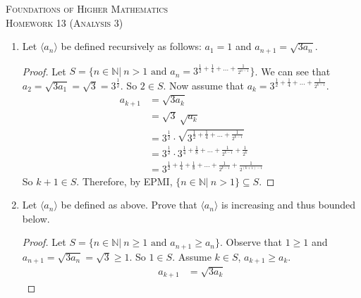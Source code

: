 \documentclass{article}
\theoremstyle{problem}
\theoremstyle{plain}
\theoremstyle{remark}
\begin{document}
\begin{center}
  \textsc{\Large Foundations of Higher Mathematics}\\[.3cm]
  \textsc{\Large Homework 13 (Analysis 3)}
\end{center}

\begin{enumerate}
\item Let $\langle a_n \rangle$ be defined recursively as follows: $a_1 = 1$ and $a_{n+1} = \sqrt{3a_n}$. 
\begin{proof}
  Let $S = \{n \in \mathbb N|\ n > 1 \text{ and } a_n = 3^{\frac{1}{2} + \frac{1}{4} + \ldots + \frac{1}{2^{n-1}}}\}$. We can see that $a_2 = \sqrt{3a_1} = \sqrt{3} = 3^{\frac{1}{2}}$. So $2 \in S$. Now assume that $a_k = 3^{\frac{1}{2} + \frac{1}{4} + \ldots + \frac{1}{2^{k-1}}}$.
  \begin{align*}
    a_{k+1} &= \sqrt{3 a_k}\\
    &= \sqrt{3}\ \sqrt{a_k}\\
    &= 3^{\frac{1}{2}} \cdot \sqrt{3^{\frac{1}{2} + \frac{1}{4} + \ldots + \frac{1}{2^{k-1}}}}\\
    &= 3^{\frac{1}{2}} \cdot 3^{\frac{1}{4} + \frac{1}{8} + \ldots + \frac{1}{2^{k-1}} + \frac{1}{2^k}}\\
    &= 3^{\frac{1}{2} + \frac{1}{4} + \frac{1}{8} + \ldots + \frac{1}{2^{k-1}} + \frac{1}{2^{(k+1)-1}}}
  \end{align*}
So $k + 1 \in S$. Therefore, by EPMI, $\{n \in \mathbb N|\ n > 1 \} \subseteq S$.
\end{proof}
\item Let $\langle a_n \rangle$ be defined as above. Prove that $\langle a_n \rangle$ is increasing and thus bounded below.
\begin{proof}
  Let $S = \{n \in \mathbb N|\ n \geq 1 \text{ and } a_{n+1} \geq a_n\}$. Observe that $1 \geq 1$ and $a_{n+1} = \sqrt{3a_n} = \sqrt{3} \geq 1$. So $1 \in S$. Assume $k \in S$, $a_{k+1} \geq a_k$.
\begin{align*}
  a_{k+1} &= \sqrt{3 a_k}  
\end{align*}
\end{proof}

\end{enumerate}
\end{document}
